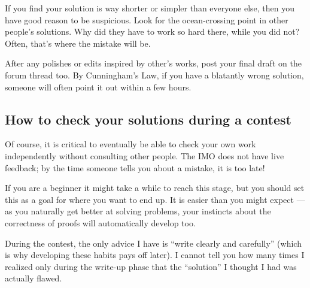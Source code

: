 \documentclass[11pt]{scrartcl}
\begin{document}
\begin{description}
  If you find your solution is way shorter or simpler
  than everyone else, then you have good reason to be suspicious.
  Look for the ocean-crossing point in other people's solutions.
  Why did they have to work so hard there, while you did not?
  Often, that's where the mistake will be.

  \ii[Step 3.] After any polishes or edits inspired by other's works,
  post your final draft on the forum thread too.
  By Cunningham's Law, if you have a blatantly wrong solution,
  someone will often point it out within a few hours.
\end{description}

\subsection{How to check your solutions during a contest}
Of course, it is critical to eventually
be able to check your own work independently
without consulting other people.
The IMO does not have live feedback;
by the time someone tells you about a mistake, it is too late!

If you are a beginner it might take a while to reach this stage,
but you should set this as a goal for where you want to end up.
It is easier than you might expect ---
as you naturally get better at solving problems, your instincts
about the correctness of proofs will automatically develop too.

During the contest, the only advice I have is
``write clearly and carefully''
(which is why developing these habits pays off later).
I cannot tell you how many times I realized only during the write-up phase
that the ``solution'' I thought I had was actually flawed.
\end{document}
